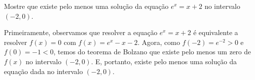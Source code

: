 
\begin{ex}\label{ex:teorema_de_Bolzano}
Mostre que existe pelo menos uma solução da equação $e^x=x+2$ no intervalo $(-2,0)$.
\end{ex}
\begin{sol}
Primeiramente, observamos que resolver a equação $e^x = x+2$ é equivalente a resolver $f(x) = 0$ com $f(x)=e^x-x-2$. Agora, como $f(-2)=e^{-2}>0$ e $f(0)=-1<0$, temos do teorema de Bolzano que existe pelo menos um zero de $f(x)$ no intervalo $(-2, 0)$. E, portanto, existe pelo menos uma solução da equação dada no intervalo $(-2, 0)$.


\end{sol}
